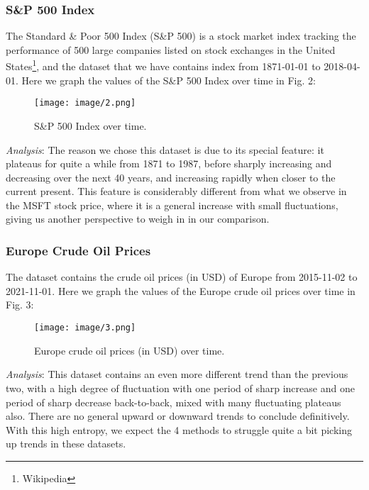 \documentclass[letterpaper, 10 pt, conference]{ieeeconf}  %
\begin{document}
        \subsubsection{S\&P 500 Index} The Standard \& Poor 500 Index (S\&P 500) is a stock market index tracking the performance of 500 large companies listed on stock exchanges in the United States\footnote{Wikipedia}, and the dataset that we have contains index from 1871-01-01 to 2018-04-01. Here we graph the values of the S\&P 500 Index over time in Fig. 2:

        \begin{figure}[thpb]
            \centering
            \texttt{[image: image/2.png]}
            \caption{S\&P 500 Index over time.}
            \label{figurelabel}
        \end{figure}

        \textit{Analysis}: The reason we chose this dataset is due to its special feature: it plateaus for quite a while from 1871 to 1987, before sharply increasing and decreasing over the next 40 years, and increasing rapidly when closer to the current present. This feature is considerably different from what we observe in the MSFT stock price, where it is a general increase with small fluctuations, giving us another perspective to weigh in in our comparison.

        \subsubsection{Europe Crude Oil Prices} The dataset contains the crude oil prices (in USD) of Europe from 2015-11-02 to 2021-11-01. Here we graph the values of the Europe crude oil prices over time in Fig. 3:

        \begin{figure}[thpb]
            \centering
             \texttt{[image: image/3.png]}
            \caption{Europe crude oil prices (in USD) over time.}
            \label{figurelabel}
        \end{figure}

        \textit{Analysis}: This dataset contains an even more different trend than the previous two, with a high degree of fluctuation with one period of sharp increase and one period of sharp decrease back-to-back, mixed with many fluctuating plateaus also. There are no general upward or downward trends to conclude definitively. With this high entropy, we expect the 4 methods to struggle quite a bit picking up trends in these datasets. 
\end{document}
